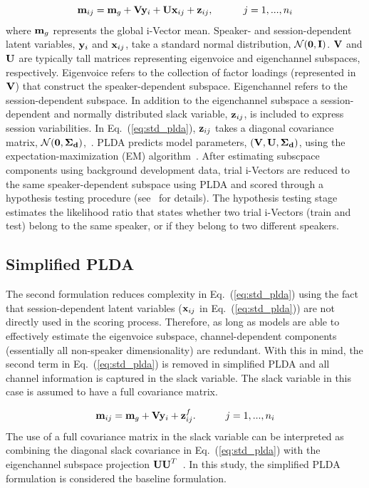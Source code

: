 \begin{equation}
\label{eq:std_plda}
{\bf m}_{ij} = {\bf m}_g + {\bf V}{\bf y}_i+{\bf U}{\bf x}_{ij}+{\bf z}_{ij},  \hspace{30pt} j=1,...,n_i
\end{equation}
where ${\bf m}_g$ represents the global i-Vector mean. Speaker- and session-dependent latent variables, ${\bf y}_i$ and ${\bf x}_{ij}$, take a standard normal distribution, $\mathcal{N}({\bf 0},{\bf I})$. ${\bf V}$ and ${\bf U}$ are typically tall matrices representing eigenvoice and eigenchannel subspaces, respectively. Eigenvoice refers to the collection of factor loadings (represented in ${\bf V}$) that construct the speaker-dependent subspace. Eigenchannel refers to the session-dependent subspace. 
In addition to the eigenchannel subspace a session-dependent and normally distributed slack variable, ${\bf z}_{ij}$, is included to express session variabilities. In Eq.~(\ref{eq:std_plda}), ${\bf z}_{ij}$ takes a diagonal covariance matrix, $\mathcal{N}({\bf 0},{\bf \Sigma_d})$,~\cite{kenny_plda,prince_plda}. 
PLDA predicts model parameters, $({\bf V},{\bf U},{\bf \Sigma_d})$, using the expectation-maximization (EM) algorithm~\cite{prince_plda}. 
After estimating subscpace components using background development data, trial i-Vectors are reduced to the same speaker-dependent subspace using PLDA and scored through a hypothesis testing procedure (see~\cite{prince_plda} for details). 
The hypothesis testing stage estimates the likelihood ratio that states whether two trial i-Vectors (train and test) belong to the same speaker, or if they belong to two different speakers. 

\subsection{Simplified PLDA}
\label{ssec:simplified_plda}
The second formulation reduces complexity in Eq.~(\ref{eq:std_plda}) using the fact that session-dependent latent variables (${\bf x}_{ij}$ in Eq.~(\ref{eq:std_plda})) are not directly used in the scoring process. 
Therefore, as long as models are able to effectively estimate the eigenvoice subspace, channel-dependent components (essentially all non-speaker dimensionality) are redundant. 
With this in mind, the second term in Eq.~(\ref{eq:std_plda}) is removed in simplified PLDA and all channel information is captured in the slack variable. 
The slack variable in this case is assumed to have a full covariance matrix.

\begin{equation}
\label{eq:simple_plda}
{\bf m}_{ij} = {\bf m}_g + {\bf V}{\bf y}_i+{\bf z}^f_{ij}.  \hspace{30pt} j=1,...,n_i
\end{equation}
The use of a full covariance matrix in the slack variable can be interpreted as combining the diagonal slack covariance in Eq.~(\ref{eq:std_plda}) with the eigenchannel subspace projection ${\bf UU}^T$~\cite{sizov2014unifying}.
In this study, the simplified PLDA formulation is considered the baseline formulation. 


